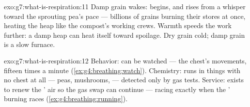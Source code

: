 \begin{solution}{exo:g7:what-is-respiration:11}
Damp grain wakes:  begins, and  rises
from a whisper toward the sprouting pea's pace --- billions
of grains burning their stores at once, heating the heap
like the compost's working crews. Warmth speeds the work
further: a damp heap can heat itself toward spoilage. Dry
grain  cold; damp grain is a slow furnace.
\end{solution}

\begin{solution}{exo:g7:what-is-respiration:12}
Behavior:  can be watched --- the chest's
movements, fifteen times a minute
(\cref{ex:g4:breathing:watch}). Chemistry:  runs
in things with no chest at all --- peas, mushrooms, 
--- detected only by gas tests. Service:  exists
to renew the ' air so the gas swap can continue ---
racing exactly when the ' burning races
(\cref{ex:g4:breathing:running}).
\end{solution}

